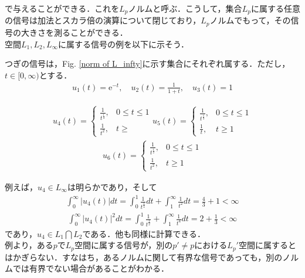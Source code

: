 \documentclass[a4paper,11pt,uplatex]{jsarticle} %
\theoremstyle{definition}	%
\newcommand{\figref}[1]{Fig. \ref{#1}}
\begin{document}
で与えることができる．これを$L_p$ノルムと呼ぶ．こうして，集合$L_p$に属する任意の信号は加法とスカラ倍の演算について閉じており，$L_p$ノルムでもって，その信号の大きさを測ることができる．\\
空間$L_1,L_2,L_{\infty}$に属する信号の例を以下に示そう．
\begin{tcolorbox}[title=例5.2,
drop small lifted shadow=black]
つぎの信号は，\figref{norm of L_infty}に示す集合にそれぞれ属する．ただし，$t \in [0,\infty)$とする．
\begin{align*}
u_1 (t) = \textrm{e}^{-t}, \quad u_2(t) = \frac{1}{1 + t}, \quad u_3(t) = 1
\end{align*}

\begin{align*}
u_4 (t) = 
\begin{cases}
    \frac{1}{t^{\frac{1}{4}}},  &0 \leq t \leq 1\\
    \frac{1}{t^2},              &t \geq  
\end{cases}
u_5 (t) =
\begin{cases}
    \frac{1}{t^{\frac{1}{4}}},  & 0 \leq t \leq 1\\
    \frac{1}{t},                & t \geq 1
\end{cases}
\end{align*}
\begin{align*}
u_6(t) =
\begin{cases}
    \frac{1}{t^\frac{1}{2}},    & 0 \leq t \leq 1\\
    \frac{1}{t^2},              & t \geq 1
\end{cases}
\end{align*}



例えば，$u_4 \in L_\infty $は明らかであり，そして
\begin{align*}
\int_0^\infty | u_4 (t) | dt = \int_0^1 \frac{1}{t^\frac{1}{4}} dt + \int_1^\infty \frac{1}{t^2} dt = \frac{4}{3} + 1 < \infty
\end{align*}
\begin{align*}
\int_0^\infty | u_4 (t) |^2 dt = \int_0^1 \frac{1}{t^\frac{1}{2}} + \int_1^\infty \frac{1}{t^4} dt = 2 + \frac{1}{3} < \infty
\end{align*}
であり，$u_4 \in L_1 \bigcap L_2$である．他も同様に計算できる．\\
例より，ある$p$で$L_p$空間に属する信号が，別の$p' \neq p $における$L_p'$空間に属するとはかぎらない．すなはち，あるノルムに関して有界な信号であっても，別のノルムでは有界でない場合があることがわかる．
\end{tcolorbox}
\end{document}
